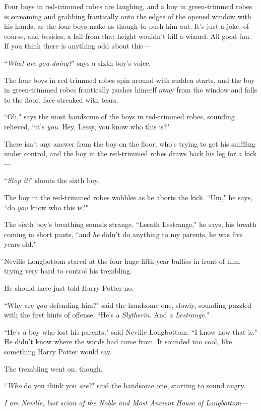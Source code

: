 Four boys in red-trimmed robes are laughing, and a boy in green-trimmed robes is screaming and grabbing frantically onto the edges of the opened window with his hands, as the four boys make as though to push him out. It's just a joke, of course, and besides, a fall from that height wouldn't kill a wizard. All good fun. If you think there is anything odd about this—

``\emph{What are you doing?}" says a sixth boy's voice.

The four boys in red-trimmed robes spin around with sudden starts, and the boy in green-trimmed robes frantically pushes himself away from the window and falls to the floor, face streaked with tears.

``Oh," says the most handsome of the boys in red-trimmed robes, sounding relieved, ``it's \emph{you}. Hey, Lessy, you know who this is?"

There isn't any answer from the boy on the floor, who's trying to get his sniffling under control, and the boy in the red-trimmed robes draws back his leg for a kick—

``\emph{Stop it!}" shouts the sixth boy.

The boy in the red-trimmed robes wobbles as he aborts the kick. ``Um," he says, ``do \emph{you} know who this is?"

The sixth boy's breathing sounds strange. ``Lesath Lestrange," he says, his breath coming in short pants, ``and \emph{he} didn't do anything to my parents, he was five years old."

\later

Neville Longbottom stared at the four huge fifth-year bullies in front of him, trying very hard to control his trembling.

He should have just told Harry Potter no.

``Why are \emph{you} defending him?" said the handsome one, slowly, sounding puzzled with the first hints of offense. ``He's a \emph{Slytherin.} And a \emph{Lestrange.}"

``He's a boy who lost his parents," said Neville Longbottom. ``I know how that is." He didn't know where the words had come from. It sounded too cool, like something Harry Potter would say.

The trembling went on, though.

``\emph{Who} do you think you \emph{are}?" said the handsome one, starting to sound angry.

\emph{I am Neville, last scion of the Noble and Most Ancient House of Longbottom—}

